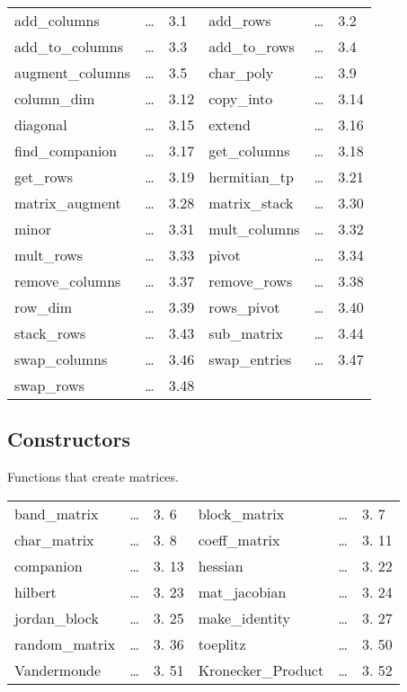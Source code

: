 \begin{center}
\begin{tabular}{l l l l l l}
add\_columns     & \ldots & 3.1  & 
add\_rows        & \ldots & 3.2  \\
add\_to\_columns & \ldots & 3.3  &
add\_to\_rows    & \ldots & 3.4  \\
augment\_columns & \ldots & 3.5  &
char\_poly       & \ldots & 3.9  \\
column\_dim      & \ldots & 3.12  &
copy\_into       & \ldots & 3.14 \\
diagonal         & \ldots & 3.15 &
extend           & \ldots & 3.16 \\
find\_companion  & \ldots & 3.17  &
get\_columns     & \ldots & 3.18 \\
get\_rows        & \ldots & 3.19 &
hermitian\_tp    & \ldots & 3.21 \\
matrix\_augment  & \ldots & 3.28 &
matrix\_stack    & \ldots & 3.30 \\
minor            & \ldots & 3.31 &
mult\_columns    & \ldots & 3.32 \\ 
mult\_rows       & \ldots & 3.33 &
pivot            & \ldots & 3.34 \\
remove\_columns  & \ldots & 3.37 &
remove\_rows     & \ldots & 3.38 \\
row\_dim         & \ldots & 3.39 &
rows\_pivot      & \ldots & 3.40 \\
stack\_rows      & \ldots & 3.43 &
sub\_matrix      & \ldots & 3.44 \\
swap\_columns    & \ldots & 3.46 &
swap\_entries    & \ldots & 3.47 \\
swap\_rows       & \ldots & 3.48 &
\end{tabular}
\end{center}

\subsection{Constructors}

Functions that create matrices.

\begin{center}
\begin{tabular}{l l l l l l}
band\_matrix       & \ldots & 3. 6 & 
block\_matrix      & \ldots & 3. 7 \\
char\_matrix       & \ldots & 3. 8 & 
coeff\_matrix      & \ldots & 3. 11 \\ 
companion          & \ldots & 3. 13 & 
hessian            & \ldots & 3. 22 \\
hilbert            & \ldots & 3. 23 & 
mat\_jacobian      & \ldots & 3. 24 \\
jordan\_block      & \ldots & 3. 25 & 
make\_identity     & \ldots & 3. 27 \\
random\_matrix     & \ldots & 3. 36 & 
toeplitz           & \ldots & 3. 50 \\
Vandermonde        & \ldots & 3. 51 &
Kronecker\_Product & \ldots & 3. 52  
\end{tabular}
\end{center}

